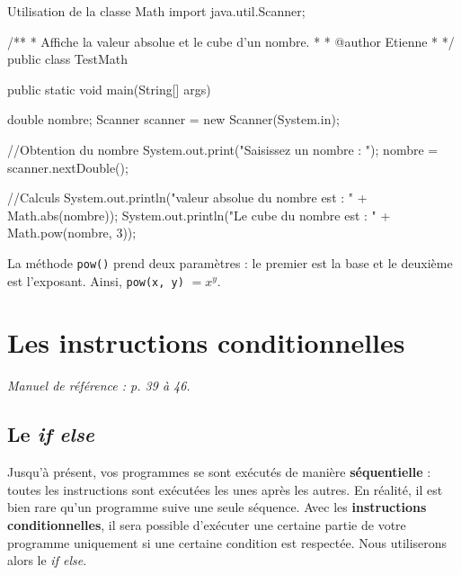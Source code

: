 \documentclass[12pt]{report}
\begin{document}
\begin{MyTCB}{Utilisation de la classe Math}
import java.util.Scanner;

/**
 * Affiche la valeur absolue et le cube d'un nombre.
 * 
 * @author Etienne
 *
 */
public class TestMath {

	public static void main(String[] args) {
		
		double nombre;
		Scanner scanner = new Scanner(System.in);
		
		//Obtention du nombre
		System.out.print("Saisissez un nombre : ");
		nombre = scanner.nextDouble();
		
		//Calculs
		System.out.println("\nLa valeur absolue du nombre est : " + Math.abs(nombre));
		System.out.println("Le cube du nombre est : " + Math.pow(nombre, 3));

	}

}
\end{MyTCB}

La méthode \texttt{pow()} prend deux paramètres : le premier est la base et le deuxième est l'exposant. Ainsi, \texttt{pow(x, y)} $= x^y$.




%
%
%
%
\chapter{Les instructions conditionnelles}

\textit{Manuel de référence : p. 39 à 46.}

\section{Le \textit{if else}}
Jusqu'à présent, vos programmes se sont exécutés de manière \textbf{séquentielle} : toutes les instructions sont exécutées les unes après les autres. En réalité, il est bien rare qu'un programme suive une seule séquence. Avec les \textbf{instructions conditionnelles}, il sera possible d'exécuter une certaine partie de votre programme uniquement si une certaine condition est respectée. Nous utiliserons alors le \emph{if else}.
\end{document}
